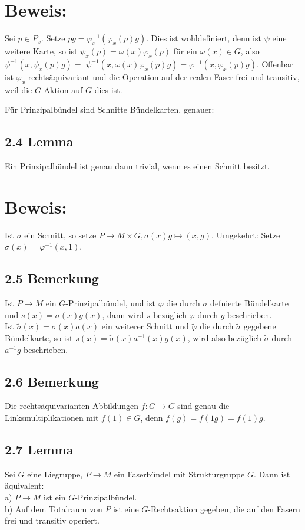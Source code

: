 \documentclass[10pt, letterpaper]{article}
\begin{document}
\section*{Beweis:}
Sei $p \in P_{x}$. Setze $p g=\varphi_{x}^{-1}\left(\varphi_{x}(p) g\right)$. Dies ist wohldefiniert, denn ist $\psi$ eine weitere Karte, so ist $\psi_{x}(p)=\omega(x) \varphi_{x}(p)$ für ein $\omega(x) \in G$, also $\psi^{-1}\left(x, \psi_{x}(p) g\right)=$ $\psi^{-1}\left(x, \omega(x) \varphi_{x}(p) g\right)=\varphi^{-1}\left(x, \varphi_{x}(p) g\right)$. Offenbar ist $\varphi_{x}$ rechtsäquivariant und die Operation auf der realen Faser frei und transitiv, weil die $G$-Aktion auf $G$ dies ist.

Für Prinzipalbündel sind Schnitte Bündelkarten, genauer:

\subsection*{2.4 Lemma}
Ein Prinzipalbündel ist genau dann trivial, wenn es einen Schnitt besitzt.

\section*{Beweis:}
Ist $\sigma$ ein Schnitt, so setze $P \rightarrow M \times G, \sigma(x) g \mapsto(x, g)$. Umgekehrt: Setze $\sigma(x)=\varphi^{-1}(x, 1)$.

\subsection*{2.5 Bemerkung}
Ist $P \rightarrow M$ ein $G$-Prinzipalbündel, und ist $\varphi$ die durch $\sigma$ defnierte Bündelkarte und $s(x)=\sigma(x) g(x)$, dann wird $s$ bezüglich $\varphi$ durch $g$ beschrieben.\\
Ist $\tilde{\sigma}(x)=\sigma(x) a(x)$ ein weiterer Schnitt und $\tilde{\varphi}$ die durch $\tilde{\sigma}$ gegebene Bündelkarte, so ist $s(x)=\tilde{\sigma}(x) a^{-1}(x) g(x)$, wird also bezüglich $\tilde{\sigma}$ durch $a^{-1} g$ beschrieben.

\subsection*{2.6 Bemerkung}
Die rechtsäquivarianten Abbildungen $f: G \rightarrow G$ sind genau die Linksmultiplikationen mit $f(1) \in G$, denn $f(g)=f(1 g)=f(1) g$.

\subsection*{2.7 Lemma}
Sei $G$ eine Liegruppe, $P \rightarrow M$ ein Faserbündel mit Strukturgruppe $G$. Dann ist äquivalent:\\
a) $P \rightarrow M$ ist ein $G$-Prinzipalbündel.\\
b) Auf dem Totalraum von $P$ ist eine $G$-Rechtsaktion gegeben, die auf den Fasern frei und transitiv operiert.
\end{document}
